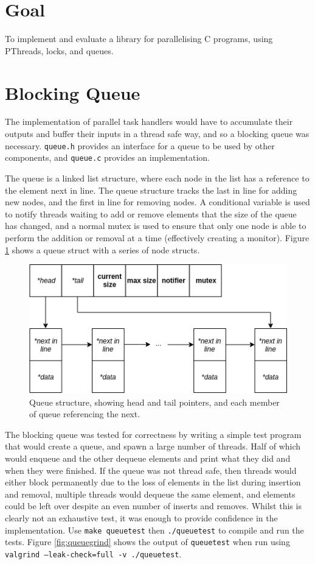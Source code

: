 \documentclass[12pt]{article}
\def\code#1{\texttt{#1}}
\begin{document}
\section*{Goal}

To implement and evaluate a library for parallelising C programs, using PThreads, locks, and queues. 

\tableofcontents

\section{Blocking Queue}

The implementation of parallel task handlers would have to accumulate their outputs and buffer their inputs in a thread safe way, and so a blocking queue was necessary. \code{queue.h} provides an interface for a queue to be used by other components, and \code{queue.c} provides an implementation.

The queue is a linked list structure, where each node in the list has a reference to the element next in line. The queue structure tracks the last in line for adding new nodes, and the first in line for removing nodes. A conditional variable is used to notify threads waiting to add or remove elements that the size of the queue has changed, and a normal mutex is used to ensure that only one node is able to perform the addition or removal at a time (effectively creating a monitor). Figure \ref{fig:queue} shows a queue struct with a series of node structs.

\begin{figure}[!ht]
	\centering 
	\includegraphics[width=0.8\linewidth]{images/queue}
	\caption{Queue structure, showing head and tail pointers, and each member of queue referencing the next.}
	\label{fig:queue}
\end{figure}

The blocking queue was tested for correctness by writing a simple test program that would create a queue, and spawn a large number of threads. Half of which would enqueue and the other dequeue elements and print what they did and when they were finished. If the queue was not thread safe, then threads would either block permanently due to the loss of elements in the list during insertion and removal, multiple threads would dequeue the same element, and elements could be left over despite an even number of inserts and removes. Whilst this is clearly not an exhaustive test, it was enough to provide confidence in the implementation. Use \code{make queuetest} then \code{./queuetest} to compile and run the tests. Figure \ref{fig:queuegrind} shows the output of \code{queuetest} when run using \code{valgrind --leak-check=full -v ./queuetest}.
\end{document}
